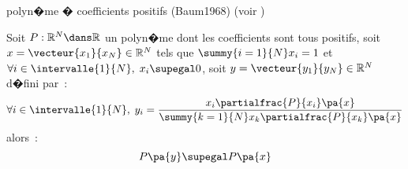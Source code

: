         \begin{xcorollary}{polyn�me � coefficients positifs (Baum1968)} \label{hmm_theorem_baumwelch_un} (voir )
        
        Soit $P : \mathbb{R}^N \dans \mathbb{R}$ un polyn�me dont les coefficients sont tous positifs, 
        soit $x = \vecteur{x_1}{x_N} \in \mathbb{R}^N$ tels que $\summy{i=1}{N}x_i = 1$ et $\forall i \in \intervalle{1}{N}, 
                \; x_i \supegal 0$, 
        soit $y = \vecteur{y_1}{y_N} \in \mathbb{R}^N$ d�fini par~:
                $$
                \forall i \in \intervalle{1}{N}, \; y_i = \frac{x_i \partialfrac{P}{x_i}\pa{x}}{\summy{k=1}{N}x_k \partialfrac{P}{x_k}\pa{x}}
                $$
        alors~:
                $$
                P\pa{y} \supegal P\pa{x}
                $$
        \end{xcorollary}



